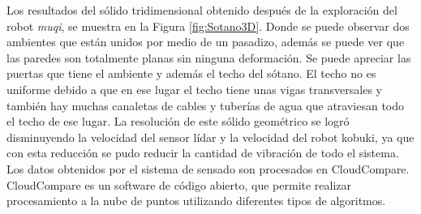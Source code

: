 
Los resultados del sólido tridimensional obtenido después de la exploración del robot
\textit{muqi}, se muestra en la Figura \ref{fig:Sotano3D}. Donde se puede observar dos 
ambientes que están unidos por medio de un pasadizo, además se puede ver que las paredes 
son totalmente planas sin ninguna deformación. Se puede apreciar las puertas que tiene 
el ambiente y además el techo del sótano. El techo no es uniforme debido a que en ese 
lugar el techo tiene unas vigas transversales y también hay muchas canaletas de cables 
y tuberías de agua que atraviesan todo el techo de ese lugar. La resolución de este 
sólido geométrico se logró disminuyendo la velocidad del sensor lídar y la velocidad 
del robot kobuki, ya que con esta reducción se pudo reducir la cantidad de vibración 
de todo el sistema. Los datos obtenidos por el sistema de sensado son procesados en 
CloudCompare. CloudCompare es un software de código abierto, que permite realizar 
procesamiento a la nube de puntos utilizando diferentes tipos de algoritmos.

